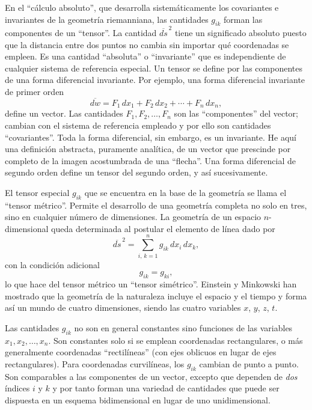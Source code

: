 \documentclass[12pt,a4paper]{book}
\begin{document}
\begin{center}
En el ``c\'alculo absoluto'', que desarrolla sistem\'aticamente los covariantes e invariantes de la geometr\'ia riemanniana, las cantidades $g_{ik}$ forman las componentes de un ``tensor''. La cantidad $\overline{ds}^{\,2}$ tiene un significado absoluto puesto que la distancia entre dos puntos no cambia sin importar qu\'e coordenadas se empleen. Es una cantidad ``absoluta'' o ``invariante'' que es independiente de cualquier sistema de referencia especial. Un tensor se define por las componentes de una forma diferencial invariante. Por ejemplo, una forma diferencial invariante de primer orden
\begin{equation}
\overline{dw} = F_1\,dx_1 + F_2\,dx_2 + \cdots + F_n\,dx_n,
\tag{15.6}
\end{equation}
define un vector. Las cantidades $F_1, F_2, \ldots, F_n$ son las ``componentes'' del vector; cambian con el sistema de referencia empleado y por ello son cantidades ``covariantes''. Toda la forma diferencial, sin embargo, es un invariante. He aqu\'i una definici\'on abstracta, puramente anal\'itica, de un vector que prescinde por completo de la imagen acostumbrada de una ``flecha''. Una forma diferencial de segundo orden define un tensor del segundo orden, y as\'i sucesivamente.

El tensor especial $g_{ik}$ que se encuentra en la base de la geometr\'ia se llama el ``tensor m\'etrico''. Permite el desarrollo de una geometr\'ia completa no solo en tres, sino en cualquier n\'umero de dimensiones. La geometr\'ia de un espacio $n$-dimensional queda determinada al postular el elemento de l\'inea dado por
\begin{equation}
\overline{ds}^{\,2} = \sum_{i,\,k=1}^{n} g_{ik}\,dx_i\,dx_k,
\tag{15.7}
\end{equation}
con la condici\'on adicional
\begin{equation}
g_{ik} = g_{ki},
\tag{15.8}
\end{equation}
lo que hace del tensor m\'etrico un ``tensor sim\'etrico''. Einstein y Minkowski han mostrado que la geometr\'ia de la naturaleza incluye el espacio y el tiempo y forma as\'i un mundo de cuatro dimensiones, siendo las cuatro variables $x$, $y$, $z$, $t$.

Las cantidades $g_{ik}$ no son en general constantes sino funciones de las variables $x_1, x_2, \ldots, x_n$. Son constantes solo si se emplean coordenadas rectangulares, o m\'as generalmente coordenadas ``rectil\'ineas'' (con ejes oblicuos en lugar de ejes rectangulares). Para coordenadas curvil\'ineas, los $g_{ik}$ cambian de punto a punto. Son comparables a las componentes de un vector, excepto que dependen de \textit{dos} \'indices $i$ y $k$ y por tanto forman una variedad de cantidades que puede ser dispuesta en un esquema bidimensional en lugar de uno unidimensional.


\end{center}
\end{document}
